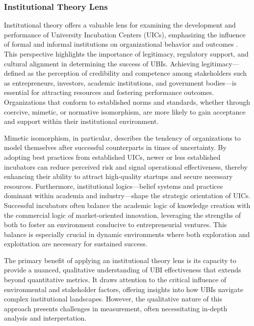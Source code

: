 \documentclass[../Main.tex]{subfiles}
\begin{document}
\subsubsection{Institutional Theory Lens}

Institutional theory offers a valuable lens for examining the development and performance of University Incubation Centers (UICs), emphasizing the influence of formal and informal institutions on organizational behavior and outcomes \cite{Kulkarni2024University}. This perspective highlights the importance of legitimacy, regulatory support, and cultural alignment in determining the success of UBIs. Achieving legitimacy—defined as the perception of credibility and competence among stakeholders such as entrepreneurs, investors, academic institutions, and government bodies—is essential for attracting resources and fostering performance outcomes. Organizations that conform to established norms and standards, whether through coercive, mimetic, or normative isomorphism, are more likely to gain acceptance and support within their institutional environment.

Mimetic isomorphism, in particular, describes the tendency of organizations to model themselves after successful counterparts in times of uncertainty. By adopting best practices from established UICs, newer or less established incubators can reduce perceived risk and signal operational effectiveness, thereby enhancing their ability to attract high-quality startups and secure necessary resources. Furthermore, institutional logics—belief systems and practices dominant within academia and industry—shape the strategic orientation of UICs. Successful incubators often balance the academic logic of knowledge creation with the commercial logic of market-oriented innovation, leveraging the strengths of both to foster an environment conducive to entrepreneurial ventures. This balance is especially crucial in dynamic environments where both exploration and exploitation are necessary for sustained success.

The primary benefit of applying an institutional theory lens is its capacity to provide a nuanced, qualitative understanding of UBI effectiveness that extends beyond quantitative metrics. It draws attention to the critical influence of environmental and stakeholder factors, offering insights into how UBIs navigate complex institutional landscapes. However, the qualitative nature of this approach presents challenges in measurement, often necessitating in-depth analysis and interpretation.
\end{document}
